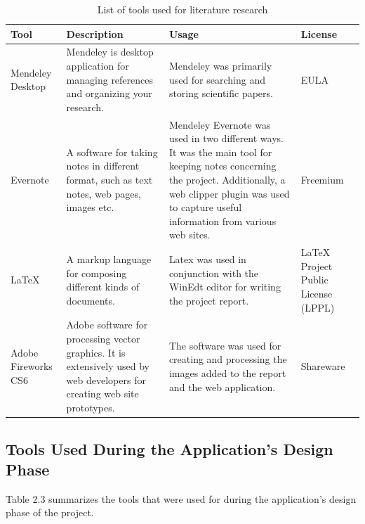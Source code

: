 \begin{table}
  \centering
  \begin{tabular}{|p{100px}|p{100px}|p{100px}|p{100px}|}
    \hline
    Tool  & Description & Usage & License \\
    \hline
    Mendeley Desktop & Mendeley is desktop application for managing references and organizing your research.& Mendeley was primarily used for searching and storing scientific papers. & EULA \\ \hline
    
    Evernote & A software for taking notes in different format, such as text notes, web pages, images etc. & Mendeley Evernote was used in two different ways. It was the main tool for keeping notes concerning the project. Additionally, a web clipper plugin was used to capture useful information from various web sites. & Freemium \\ \hline
    
    LaTeX & A markup language for composing different kinds of documents. & Latex was used in conjunction with the WinEdt editor for writing the project report. & LaTeX Project Public License (LPPL) \\ \hline
    
    Adobe Fireworks CS6 & Adobe software for processing vector graphics. It is extensively used by web developers for creating web site prototypes.  & The software was used for creating and processing the images added to the report and the web application. & Shareware \\ \hline
    
    \hline
  \end{tabular}
  \caption{List of tools used for literature research}\label{literatureTools}
\end{table}


\subsection{Tools Used During the Application's Design Phase}

Table 2.3 summarizes the tools that were used for during the application's design phase of the project.

